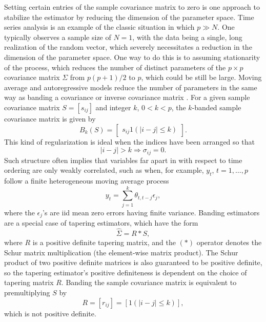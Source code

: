Setting certain entries of the sample covariance matrix to zero is one approach to stabilize the estimator by reducing the dimension of the parameter space. Time series analysis is an example of the classic situation in which $p \gg N$. One typically observes a sample size of $N = 1$, with the data being a single, long realization of the random vector, which severely necessitates a reduction in the dimension of the parameter space. One way to do this is to assuming stationarity of the process, which reduces the number of distinct parameters of the $p \times p$ covariance matrix $\Sigma$ from $p\left(p + 1\right)/2$ to $p$, which could be still be large. Moving average and autoregressive models reduce the number of parameters in the same way as banding a covariance or inverse covariance matrix \citep{bickel2008regularized,wu2009banding}.  For a given sample covariance matrix $S = \left[ s_{ij} \right]$ and integer $k$, $0 < k < p$, the $k$-banded sample covariance matrix is given by
\begin{equation} \label{eq:general-banded-estimator} 
B_k\left(S\right) = \begin{bmatrix} s_{ij} 1\left(\vert i-j \vert \le k\right) \end{bmatrix}.
\end{equation}
\noindent
This kind of regularization is ideal when the indices have been arranged so that
\[
\vert i -  j\vert > k \Rightarrow  \sigma_{ij} = 0.
\]
Such structure often implies that variables far apart in with respect to time ordering are only weakly correlated, such as when, for example, $y_t$, $t = 1, \dots,p$ follow a finite heterogeneous moving average process
\begin{equation*} 
y_t = \sum_{j = 1}^k \theta_{t, t-j} \epsilon_j,
\end{equation*}
\noindent
where the $\epsilon_j$'s are iid mean zero errors having finite variance. Banding estimators are a special case of tapering estimators, which have the form
\begin{equation} \label{eq:general-tapering-estimator} 
\hat{\Sigma} = R \ast S, 
\end{equation}
\noindent
where $R$ is a positive definite tapering matrix, and the $\left( \ast \right)$ operator denotes the Schur matrix multiplication (the element-wise matrix product). The Schur product of two positive definite matrices is also guaranteed to be positive definite, so the tapering estimator's positive definiteness is dependent on the choice of tapering matrix $R$. Banding the sample covariance matrix is equivalent to premultiplying $S$ by 
\[
R = \left[r_{ij}\right] = \left[ 1\left(\vert i-j \vert \le k\right)\right],
\] 
\noindent
which is not positive definite. %

